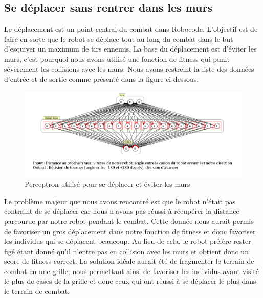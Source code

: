 \documentclass[a4paper,11pt]{article}
\begin{document}
\subsection{Se déplacer sans rentrer dans les murs}
Le déplacement est un point central du combat dans Robocode. L'objectif est de faire en sorte que le robot se déplace tout au long du combat dans le but d'esquiver un maximum de tirs ennemis. La base du déplacement est d'éviter les murs, c'est pourquoi nous avons utilisé une fonction de fitness qui punit sévèrement les collisions avec les murs. Nous avons restreint la liste des données d'entrée et de sortie comme présenté dans la figure ci-dessous. 

\begin{figure}[!h]
\centering
\includegraphics{images/move_network.png}
\caption{Perceptron utilisé pour se déplacer et éviter les murs}
\label{move_perceptron}
\end{figure}

Le problème majeur que nous avons rencontré est que le robot n'était pas contraint de se déplacer car nous n'avons pas réussi à récupérer la distance parcourue par notre robot pendant le combat. Cette donnée nous aurait permis de favoriser un gros déplacement dans notre fonction de fitness et donc favoriser les individus qui se déplacent beaucoup. Au lieu de cela, le robot préfère rester figé étant donné qu'il n'entre pas en collision avec les murs et obtient donc un score de fitness correct. La solution idéale aurait été de fragmenter le terrain de combat en une grille, nous permettant ainsi de favoriser les individus ayant visité le plus de cases de la grille et donc ceux qui ont réussi à se déplacer le plus dans le terrain de combat.
\end{document}

